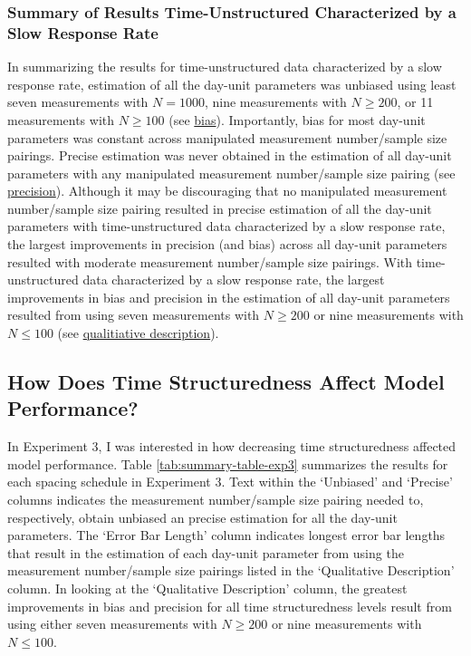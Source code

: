 \documentclass[
12pt, %
twoside,
english]{guelphthesis}
\begin{document}
\hypertarget{summary-of-results-time-unstructured-characterized-by-a-slow-response-rate}{%
\subsubsection{Summary of Results Time-Unstructured Characterized by a Slow Response Rate}\label{summary-of-results-time-unstructured-characterized-by-a-slow-response-rate}}

In summarizing the results for time-unstructured data characterized by a slow response rate, estimation of all the day-unit parameters was unbiased using least seven measurements with \(N = 1000\), nine measurements with \(N \ge 200\), or 11 measurements with \(N \ge 100\) (see \protect\hyperlink{bias-slow-exp3}{bias}). Importantly, bias for most day-unit parameters was constant across manipulated measurement number/sample size pairings. Precise estimation was never obtained in the estimation of all day-unit parameters with any manipulated measurement number/sample size pairing (see \protect\hyperlink{precision-slow-exp3}{precision}). Although it may be discouraging that no manipulated measurement number/sample size pairing resulted in precise estimation of all the day-unit parameters with time-unstructured data characterized by a slow response rate, the largest improvements in precision (and bias) across all day-unit parameters resulted with moderate measurement number/sample size pairings. With time-unstructured data characterized by a slow response rate, the largest improvements in bias and precision in the estimation of all day-unit parameters resulted from using seven measurements with \(N \ge 200\) or nine measurements with \(N \le 100\) (see \protect\hyperlink{qualitative-slow-exp3}{qualitiative description}).

\hypertarget{how-does-time-structuredness-affect-model-performance}{%
\subsection{How Does Time Structuredness Affect Model Performance?}\label{how-does-time-structuredness-affect-model-performance}}

In Experiment 3, I was interested in how decreasing time structuredness affected model performance. Table \ref{tab:summary-table-exp3} summarizes the results for each spacing schedule in Experiment 3. Text within the `Unbiased' and `Precise' columns indicates the measurement number/sample size pairing needed to, respectively, obtain unbiased an precise estimation for all the day-unit parameters. The `Error Bar Length' column indicates longest error bar lengths that result in the estimation of each day-unit parameter from using the measurement number/sample size pairings listed in the `Qualitative Description' column. In looking at the `Qualitative Description' column, the greatest improvements in bias and precision for all time structuredness levels result from using either seven measurements with \(N \ge 200\) or nine measurements with \(N \le 100\).
\end{document}
